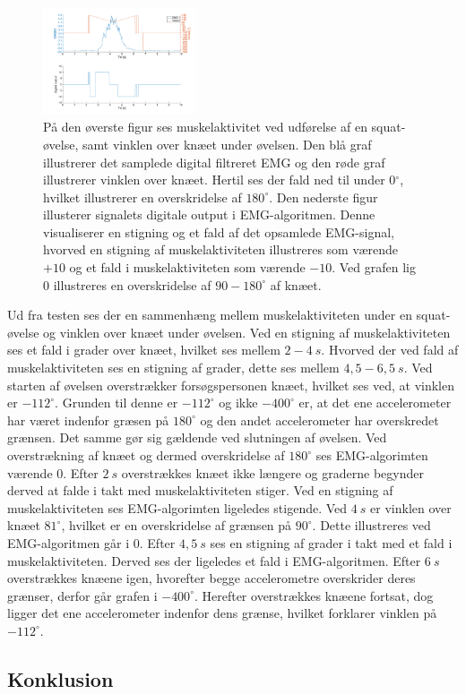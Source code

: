 \begin{figure}[H]
\centering
\includegraphics[width=0.4\textwidth]{figures/test_brugerinput}
\caption{På den øverste figur ses muskelaktivitet ved udførelse af en squat-øvelse, samt vinklen over knæet under øvelsen. Den blå graf illustrerer det samplede digital filtreret EMG og den røde graf illustrerer vinklen over knæet. Hertil ses der fald ned til under 0$^{\circ}$, hvilket illustrerer en overskridelse af $180^{\circ}$. Den nederste figur illusterer signalets digitale output i EMG-algoritmen. Denne visualiserer en stigning og et fald af det opsamlede EMG-signal, hvorved en stigning af muskelaktiviteten illustreres som værende $+10$ og et fald i muskelaktiviteten som værende $-10$. Ved grafen lig 0 illustreres en overskridelse af $90-180^{\circ}$ af knæet.}
\label{fig:test_brugerinput}
\end{figure}

Ud fra testen ses der en sammenhæng mellem muskelaktiviteten under en squat-øvelse og vinklen over knæet under øvelsen. Ved en stigning af muskelaktiviteten ses et fald i grader over knæet, hvilket ses mellem $2-4~s$. Hvorved der ved fald af muskelaktiviteten ses en stigning af grader, dette ses mellem $4,5-6,5~s$.
Ved starten af øvelsen overstrækker forsøgspersonen knæet, hvilket ses ved, at vinklen er $-112^{\circ}$. Grunden til denne er $-112^{\circ}$ og ikke $-400^{\circ}$ er, at det ene accelerometer har været indenfor græsen på $180^{\circ}$ og den andet accelerometer har overskredet grænsen. Det samme gør sig gældende ved slutningen af øvelsen. Ved overstrækning af knæet og dermed overskridelse af $180^{\circ}$ ses EMG-algorimten værende 0. 
Efter $2~s$ overstrækkes knæet ikke længere og graderne begynder derved at falde i takt med muskelaktiviteten stiger. Ved en stigning af muskelaktiviteten ses EMG-algorimten ligeledes stigende. Ved $4~s$ er vinklen over knæet $81^{\circ}$, hvilket er en overskridelse af grænsen på $90^{\circ}$. Dette illustreres ved EMG-algoritmen går i 0. 
Efter $4,5~s$ ses en stigning af grader i takt med et fald i muskelaktiviteten. Derved ses der ligeledes et fald i EMG-algoritmen. 
Efter $6~s$ overstrækkes knæene igen, hvorefter begge accelerometre overskrider deres grænser, derfor går grafen i $-400^{\circ}$. Herefter overstrækkes knæene fortsat, dog ligger det ene accelerometer indenfor dens grænse, hvilket forklarer vinklen på $-112^{\circ}$. 




\subsection{Konklusion}

